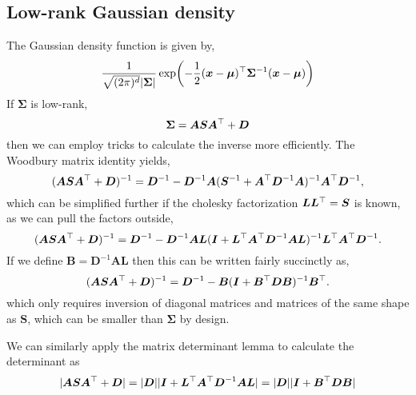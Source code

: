 \documentclass{article}
\newcommand{\mix}{\bm{A}}
\newcommand{\mean}{\mu}
\newcommand{\meanvec}{\bm{\mean}}
\begin{document}
\subsection{Low-rank Gaussian density}
\newcommand{\excov}{\bm{\Sigma}}
The Gaussian density function is given by,
\begin{equation}
\frac{1}{\sqrt{(2\pi)^d}|\excov|}\exp(-\frac{1}{2}(\x-\meanvec)\T\excov^{-1}(\x-\meanvec))
\end{equation}
If $\excov$ is low-rank,
\begin{equation}
\excov=\mix\bm{S}\mix\T+\bm{D}
\end{equation}
then we can employ tricks to calculate the inverse more efficiently. The Woodbury matrix identity yields,
\begin{equation}
(\mix\bm{S}\mix\T+\bm{D})^{-1}=\bm{D}^{-1}-\bm{D}^{-1}\mix(\bm{S}^{-1}+\mix\T\bm{D}^{-1}\mix)^{-1}\mix\T\bm{D}^{-1},
\end{equation}
which can be simplified further if the cholesky factorization $\bm{L}\bm{L}^\top=\bm{S}$ is known, as we can pull the factors outside,
\begin{equation}
(\mix\bm{S}\mix\T+\bm{D})^{-1}=\bm{D}^{-1}-\bm{D}^{-1}\mix\bm{L}(\bm{I}+\bm{L}\T\mix\T\bm{D}^{-1}\mix\bm{L})^{-1}\bm{L}\T\mix\T\bm{D}^{-1}.
\end{equation}
If we define $\bm{B}=\bm{D}^{-1}\mix\bm{L}$ then this can be written fairly succinctly as,
\begin{equation}
(\mix\bm{S}\mix\T+\bm{D})^{-1}=\bm{D}^{-1}-\bm{B}(\bm{I}+\bm{B}\T\bm{D}\bm{B})^{-1}\bm{B}\T.
\end{equation}
which only requires inversion of diagonal matrices and matrices of the same shape as $\bm{S}$, which can be smaller than $\excov$ by design.

We can similarly apply the matrix determinant lemma to calculate the determinant as
\begin{equation}
|\mix\bm{S}\mix\T+\bm{D}|=|\bm{D}||\bm{I}+\bm{L}\T\mix\T\bm{D}^{-1}\mix\bm{L}|=|\bm{D}||\bm{I}+\bm{B}\T\bm{D}\bm{B}|
\end{equation}
\end{document}
